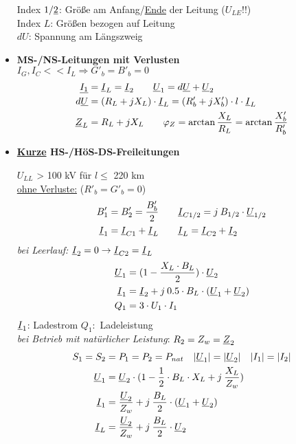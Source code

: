 \begin{itemize}
Index $1/\underline{2}$: Größe am Anfang/\ul{Ende} der Leitung ($U_{LE}$!!)\\
Index $L$: Größen bezogen auf Leitung\\
$dU$: Spannung am Längszweig\\

\newpage
\item[] \textbf{MS-/NS-Leitungen mit Verlusten}\\
    $I_G, I_C<< I_L \Rightarrow G'_b = B'_b = 0$
        \begin{align*}
            \underline{I_1} &= \underline{I}_L = \underline{I}_2 \qquad
            \underline{U}_1 = d \underline{U} + \underline{U}_2\\
            d \underline{U} &= (R_L + jX_L) \cdot \underline{I}_L = (R'_b +jX'_b) \cdot l \cdot \underline{I}_L\\
            \underline{Z}_L &= R_L +jX_L \qquad \varphi_Z =\arctan \frac{X_L}{R_L} = \arctan \frac{X'_b}{R'_b}
        \end{align*}

\item[] \textbf{\ul{Kurze} HS-/HöS-DS-Freileitungen}

    $U_{LL}$ > 100 kV für $l\leq$ 220 km\\

    \ul{ohne Verluste:} ($R'_b = G'_b = 0$)
    \begin{align*}
        B'_1 &= B'_2 = \frac{B'_b}{2} \qquad
        \underline{I}_{C1/2} = j \: B_{1/2} \cdot \underline{U}_{1/2}\\
        \underline{I}_1 &= \underline{I}_{C1} + \underline{I}_L \qquad  \underline{I}_L =  \underline{I}_{C2} +  \underline{I}_2
    \end{align*}
    \textit{bei Leerlauf:} $\underline{I}_2 = 0 \rightarrow \underline{I}_{C2} = \underline{I}_L$
    \begin{align*}
        \underline{U}_1 &= (1 - \frac{X_L\cdot B_L}{2}) \cdot \underline{U}_2\\
        \underline{I}_1 &=  \underline{I}_2 + j \: 0.5 \cdot B_L \cdot ( \underline{U}_1 + \underline{U}_2)\\
        Q_1 &= 3\cdot U_1 \cdot I_1
    \end{align*}
    $\underline{I}_1$: Ladestrom \qquad
    $Q_1:$ Ladeleistung\\

    \textit{bei Betrieb mit natürlicher Leistung}: $R_2 = Z_w = \underline{Z}_2$
        \begin{align*}
            S_1 = S_2 &= P_1 = P_2 = P_{nat} \quad
            |\underline{U}_1| = |\underline{U}_2| \quad |I_1| = |I_2|\\
            \underline{U}_1 &= \underline{U}_2 \cdot(1-\frac{1}{2} \cdot B_L \cdot X_L + j\: \frac{X_L}{Z_w})\\
            \underline{I}_1 &= \frac{\underline{U}_2}{Z_w}+j\: \frac{B_L}{2}\cdot (\underline{U}_1 + \underline{U}_2)\\
            \underline{I}_L &= \frac{\underline{U}_2}{Z_w}+j\: \frac{B_L}{2}\cdot \underline{U}_2\\
        \end{align*}


\end{itemize}
